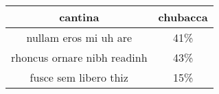 \begin{tabular}{c|c}
    cantina					& chubacca \\
    \hline
    nullam eros mi uh are  	& 41\% \\
    rhoncus ornare nibh readinh  			& 43\% \\
    fusce sem libero thiz & 15\% \\
\end{tabular}

